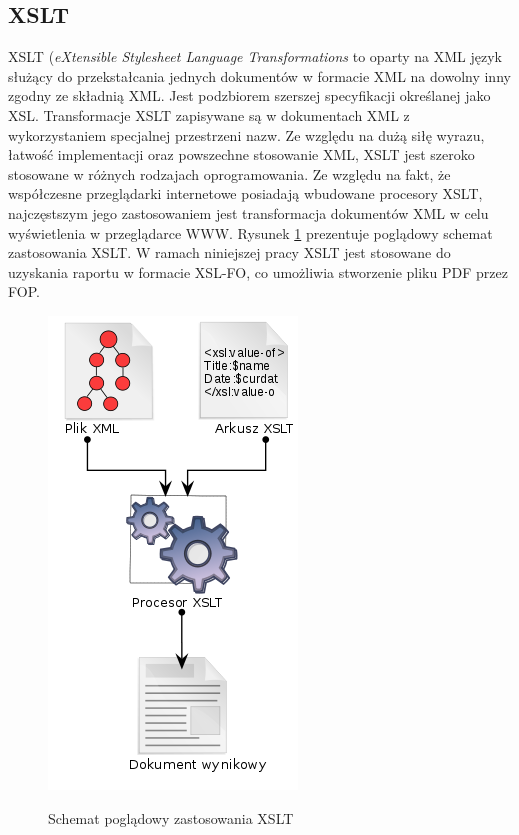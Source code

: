 \documentclass[11pt,a4paper]{article}
\begin{document}
\subsection{XSLT} \label{tools:xslt}
XSLT (\emph{eXtensible Stylesheet Language Transformations} to oparty na XML język służący do przekstałcania jednych dokumentów w formacie XML na dowolny inny zgodny ze składnią XML. Jest podzbiorem szerszej specyfikacji określanej jako XSL. Transformacje XSLT zapisywane są w dokumentach XML z wykorzystaniem specjalnej przestrzeni nazw. Ze względu na dużą siłę wyrazu, łatwość implementacji oraz powszechne stosowanie XML, XSLT jest szeroko stosowane w różnych rodzajach oprogramowania. Ze względu na fakt, że współczesne przeglądarki internetowe posiadają wbudowane procesory XSLT, najczęstszym jego zastosowaniem jest transformacja dokumentów XML w celu wyświetlenia w przeglądarce WWW. Rysunek \ref{img:xslt} prezentuje poglądowy schemat zastosowania XSLT. W ramach niniejszej pracy XSLT jest stosowane do uzyskania raportu w formacie XSL-FO, co umożliwia stworzenie pliku PDF przez FOP.
\begin{figure}[h]
\centering
\caption{Schemat poglądowy zastosowania XSLT}
\includegraphics[scale=0.5]{xslt}
\label{img:xslt}
\end{figure}
\end{document}
